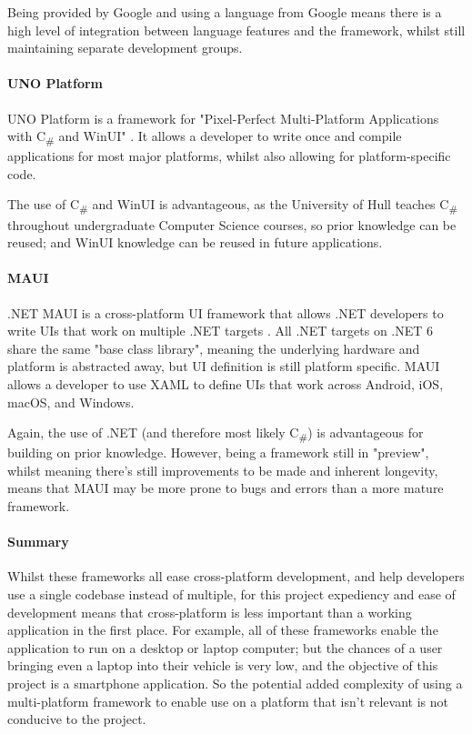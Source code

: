 \documentclass[11pt, a4paper, notitlepage]{report}
\begin{document}
Being provided by Google and using a language from Google means there is a high level of integration between language features and the framework, whilst still maintaining separate development groups.

\paragraph{UNO Platform}
UNO Platform is a framework for "Pixel-Perfect Multi-Platform Applications with C\textsubscript{\#} and WinUI" \citep{UnoWebsite}. It allows a developer to write once and compile applications for most major platforms, whilst also allowing for platform-specific code. 

The use of C\textsubscript{\#} and WinUI is advantageous, as the University of Hull teaches C\textsubscript{\#} throughout undergraduate Computer Science courses, so prior knowledge can be reused; and WinUI knowledge can be reused in future applications.

\paragraph{MAUI}
.NET MAUI is a cross-platform UI framework that allows .NET developers to write UIs that work on multiple .NET targets \citep{MAUIWebsite}. All .NET targets on .NET 6 share the same "base class library", meaning the underlying hardware and platform is abstracted away, but UI definition is still platform specific. MAUI allows a developer to use XAML to define UIs that work across Android, iOS, macOS, and Windows.

Again, the use of .NET (and therefore most likely C\textsubscript{\#}) is advantageous for building on prior knowledge. However, being a framework still in "preview", whilst meaning there's still improvements to be made and inherent longevity, means that MAUI may be more prone to bugs and errors than a more mature framework.

\paragraph{Summary}
Whilst these frameworks all ease cross-platform development, and help developers use a single codebase instead of multiple, for this project expediency and ease of development means that cross-platform is less important than a working application in the first place. For example, all of these frameworks enable the application to run on a desktop or laptop computer; but the chances of a user bringing even a laptop into their vehicle is very low, and the objective of this project is a smartphone application. So the potential added complexity of using a multi-platform framework to enable use on a platform that isn't relevant is not conducive to the project.
\end{document}
